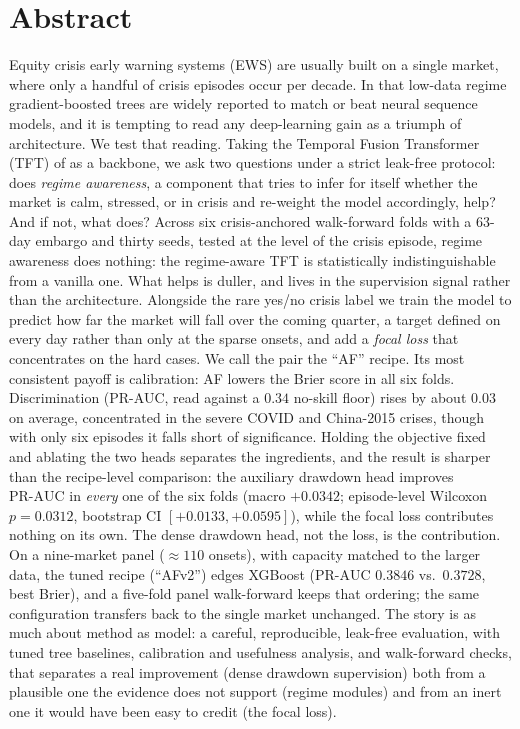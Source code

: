 \documentclass[11pt,a4paper]{article}
\newcommand{\prauc}{\mbox{PR-AUC}}
\begin{document}
\clearpage
\section*{Abstract}
\noindent
Equity crisis early warning systems (EWS) are usually built on a single market,
where only a handful of crisis episodes occur per decade. In that low-data
regime gradient-boosted trees are widely reported to match or beat neural
sequence models, and it is tempting to read any deep-learning gain as a triumph
of architecture. We test that reading. Taking the Temporal Fusion Transformer
(TFT) of \citet{lim2021tft} as a backbone, we ask two questions under a strict
leak-free protocol: does \emph{regime awareness}, a component that tries to
infer for itself whether the market is calm, stressed, or in crisis and
re-weight the model accordingly, help? And if not, what does? Across six
crisis-anchored walk-forward folds with a 63-day embargo and thirty seeds,
tested at the level of the crisis episode, regime awareness does nothing: the
regime-aware TFT is statistically indistinguishable from a vanilla one. What
helps is duller, and lives in the supervision signal rather than the
architecture.
Alongside the rare yes/no crisis label we train the model to predict how far the
market will fall over the coming quarter, a target defined on every day rather
than only at the sparse onsets, and add a \emph{focal loss} that concentrates on
the hard cases. We call the pair the ``AF'' recipe. Its most consistent payoff
is calibration: AF lowers the Brier score in all six folds. Discrimination
(PR-AUC, read against a $0.34$ no-skill floor) rises by about $0.03$ on average,
concentrated in the severe COVID and China-2015 crises, though with only six
episodes it falls short of significance. Holding the objective fixed and
ablating the two heads separates the ingredients, and the result is sharper than
the recipe-level comparison: the auxiliary drawdown head improves $\prauc$ in
\emph{every} one of the six folds (macro $+0.0342$; episode-level Wilcoxon
$p=0.0312$, bootstrap CI $[+0.0133,+0.0595]$), while the focal loss contributes
nothing on its own. The dense drawdown head, not the loss, is the contribution.
On a nine-market panel
($\approx 110$ onsets), with capacity matched to the larger data, the tuned
recipe (``AFv2'') edges XGBoost ($\prauc$ $0.3846$ vs.\ $0.3728$, best Brier), and
a five-fold panel walk-forward keeps that ordering; the same configuration
transfers back to the single market unchanged. The story is as much about method
as model: a careful, reproducible, leak-free evaluation, with tuned tree
baselines, calibration and usefulness analysis, and walk-forward checks, that
separates a real improvement (dense drawdown supervision) both from a plausible
one the evidence does not support (regime modules) and from an inert one it
would have been easy to credit (the focal loss).
\end{document}
